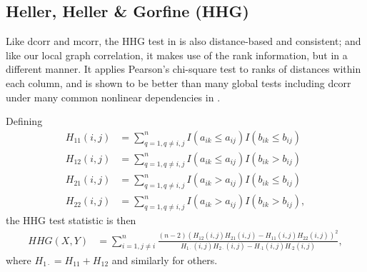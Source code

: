 \documentclass[11pt]{article}
\begin{document}

\subsection{Heller, Heller \& Gorfine (HHG)}
\label{sec:hhg}
Like dcorr and mcorr, the HHG test in \cite{HellerGorfine2013} is also distance-based and consistent; and like our local graph correlation, it makes use of the rank information, but in a different manner. It applies Pearson's chi-square test to ranks of distances within each column, and is shown to be better than many global tests including dcorr under many common nonlinear dependencies in \cite{GorfineHellerHeller2012, HellerGorfine2013}. 

Defining 
\begin{align*}
H_{11}(i,j) &= \sum_{q=1,q\neq i,j}^{n}I(a_{ik} \leq a_{ij})I(b_{ik} \leq b_{ij}) \\
H_{12}(i,j) &= \sum_{q=1,q\neq i,j}^{n}I(a_{ik} \leq a_{ij})I(b_{ik} > b_{ij}) \\
H_{21}(i,j) &= \sum_{q=1,q\neq i,j}^{n}I(a_{ik} > a_{ij})I(b_{ik} \leq b_{ij}) \\
H_{22}(i,j) &= \sum_{q=1,q\neq i,j}^{n}I(a_{ik} > a_{ij})I(b_{ik} > b_{ij}),
\end{align*}
the HHG test statistic is then
\begin{align*}
HHG(X,Y) &= \sum_{i=1,j\neq i}^{n} \frac{(n-2)(H_{12}(i,j)H_{21}(i,j)-H_{11}(i,j)H_{22}(i,j))^2}{H_{1 \cdot}(i,j)H_{2 \cdot}(i,j)-H_{\cdot 1}(i,j)H_{\cdot 2}(i,j)},
\end{align*}
where $H_{1 \cdot}=H_{11}+H_{12}$ and similarly for others.
\end{document}
